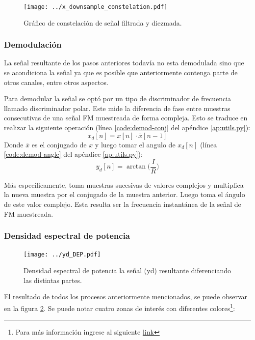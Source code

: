 \begin{figure}[ht!]
	\centering
	\texttt{[image: ../x\_downsample\_constelation.pdf]}
	\caption{Gráfico de constelación de señal filtrada y diezmada.}
	\label{fig:x_downsample_constelation}
\end{figure}

\subsubsection{Demodulación}
La señal resultante de los pasos anteriores todavía no esta demodulada sino que se acondiciona la señal ya que es posible que anteriormente contenga parte de otros canales, entre otros aspectos. 

Para demodular la señal se optó por un tipo de discriminador de frecuencia llamado discriminador polar.
Este mide la diferencia de fase entre muestras consecutivas de una señal FM muestreada de forma compleja. Esto se traduce en realizar la siguiente operación (línea \ref{code:demod-conj} del apéndice \ref{ap:utils.py}):
$$
	x_d[n] = x[n] \cdot \overline{x}[n-1]
$$
Donde $\overline{x}$ es el conjugado de $x$ y luego tomar el angulo de $x_d[n]$ (línea \ref{code:demod-angle} del apéndice \ref{ap:utils.py}):
$$
	y_d[n] = \arctan\Big( \frac{I}{R} \Big)
$$

Más específicamente, toma muestras sucesivas de valores complejos y multiplica la nueva muestra por el conjugado de la muestra anterior. Luego toma el ángulo de este valor complejo. Esta resulta ser la frecuencia instantánea de la señal de FM muestreada.

\subsubsection{Densidad espectral de potencia}

\begin{figure}[ht!]
	\centering
	\texttt{[image: ../yd\_DEP.pdf]}
	\caption{Densidad espectral de potencia la señal (yd) resultante diferenciando las distintas partes.}
	\label{fig:yd-DEP}
\end{figure}

El resultado de todos los procesos anteriormente mencionados, se puede observar en la figura \ref{fig:yd-DEP}.
Se puede notar cuatro zonas de interés con diferentes colores\footnote{Para más información ingrese al siguiente \href{https://en.wikipedia.org/wiki/FM\_broadcasting\#Other\_subcarrier\_services}{link}}:

